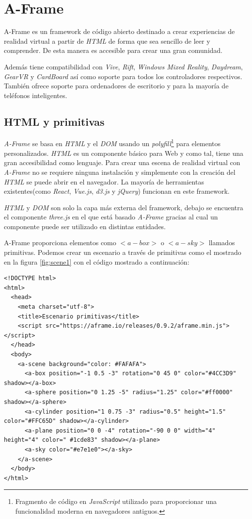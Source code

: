 \section{A-Frame}
\label{sec:aframe}
A-Frame es un framework de código abierto destinado a crear experiencias de realidad virtual a partir de \textit{HTML} de forma que sea sencillo de leer y comprender. De esta manera es accesible para crear una gran comunidad.



Además tiene compatibilidad con \textit{Vive}, \textit{Rift}, \textit{Windows Mixed Reality}, \textit{Daydream}, \textit{GearVR} y \textit{CardBoard} así como soporte para todos los controladores respectivos. También ofrece soporte para ordenadores de escritorio y para la mayoría de teléfonos inteligentes.

\subsection{HTML y primitivas}
\textit{A-Frame }se basa en \textit{HTML} y el \textit{DOM} usando un \textit{polyfill}\footnote{Fragmento de código en \textit{JavaScript} utilizado para proporcionar una funcionalidad moderna en navegadores antiguos.} para elementos personalizados. \textit{HTML} es un componente básico para Web y como tal, tiene una gran accesibilidad como lenguaje. Para crear una escena de realidad virtual con \textit{A-Frame} no se requiere ninguna instalación y simplemente con la creación del \textit{HTML} se puede abrir en el navegador. La mayoría de herramientas existentes(como \textit{React}, \textit{Vue.js}, \textit{d3.js} y \textit{jQuery}) funcionan en este framework.

\textit{HTML} y \textit{DOM} son solo la capa más externa del framework, debajo se encuentra el componente \textit{three.js} en el que está basado \textit{A-Frame} gracias al cual un componente puede ser utilizado en distintas entidades.

A-Frame proporciona elementos como \textit{$<a-box>$} o \textit{$<a-sky>$} llamados primitivas. Podemos crear un escenario a través de primitivas como el mostrado en la figura \ref{fig:scene1} con el código mostrado a continuación:


\begin{lstlisting}[caption=Código escenario primitivas]
<!DOCTYPE html>
<html>
  <head>
    <meta charset="utf-8">
    <title>Escenario primitivas</title>
    <script src="https://aframe.io/releases/0.9.2/aframe.min.js"></script>
  </head>
  <body>
    <a-scene background="color: #FAFAFA">
      <a-box position="-1 0.5 -3" rotation="0 45 0" color="#4CC3D9" shadow></a-box>
      <a-sphere position="0 1.25 -5" radius="1.25" color="#ff0000" shadow></a-sphere>
      <a-cylinder position="1 0.75 -3" radius="0.5" height="1.5" color="#FFC65D" shadow></a-cylinder>
      <a-plane position="0 0 -4" rotation="-90 0 0" width="4" height="4" color=" #1cde83" shadow></a-plane>
      <a-sky color="#e7e1e0"></a-sky>
    </a-scene>
  </body>
</html>
\end{lstlisting}


